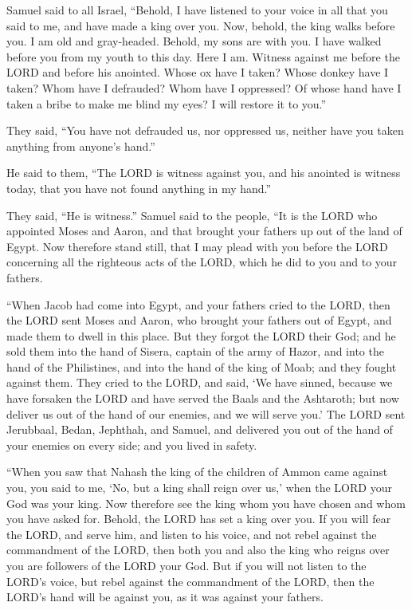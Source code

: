 \mychapter{} \myverse*{}Samuel said to all Israel, “Behold, I have listened to your voice
in all that you said to me, and have made a king over you.
\myverse{}Now, behold, the king walks before you. I am old and gray-headed. Behold, my
sons are with you. I have walked before you from my youth to this day.
\myverse{}Here I am. Witness against me before the LORD and before his anointed. Whose
ox have I taken? Whose donkey have I taken? Whom have I defrauded? Whom have I oppressed? Of whose hand
have I taken a bribe to make me blind my eyes? I will restore it to you.”

\myverse{}They said, “You have not defrauded us, nor oppressed us, neither
have you taken anything from anyone’s hand.”

\myverse{}He said to them, “The LORD is witness against you, and his anointed
is witness today, that you have not found anything in my hand.”

They said, “He is witness.”
\myverse{}Samuel said to the people, “It is the LORD who appointed Moses and Aaron, and
that brought your fathers up out of the land of Egypt.
\myverse{}Now therefore stand still, that I may plead with you before the LORD concerning
all the righteous acts of the LORD, which he did to you and to your fathers.

\myverse{}“When Jacob had come into Egypt, and your fathers cried to the
LORD, then the LORD sent Moses and Aaron, who brought your fathers out of Egypt, and made them to dwell
in this place.
\myverse{}But they forgot the LORD their God; and he sold them into the hand of Sisera,
captain of the army of Hazor, and into the hand of the Philistines, and into the hand of the king of Moab;
and they fought against them.
\myverse{}They cried to the LORD, and said, ‘We have sinned, because we have forsaken
the LORD and have served the Baals and the Ashtaroth; but now deliver us out of the hand of our enemies,
and we will serve you.’
\myverse{}The LORD sent Jerubbaal, Bedan, Jephthah, and Samuel, and delivered you out
of the hand of your enemies on every side; and you lived in safety.

\myverse{}“When you saw that Nahash the king of the children of Ammon
came against you, you said to me, ‘No, but a king shall reign over us,’ when the LORD your God was your
king.
\myverse{}Now therefore see the king whom you have chosen and whom you have asked for.
Behold, the LORD has set a king over you.
\myverse{}If you will fear the LORD, and serve him, and listen to his voice, and not
rebel against the commandment of the LORD, then both you and also the king who reigns over you are followers
of the LORD your God.
\myverse{}But if you will not listen to the LORD’s voice, but rebel against the commandment
of the LORD, then the LORD’s hand will be against you, as it was against your fathers.

